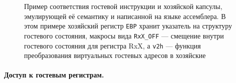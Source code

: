 

\begin{figure}[htb]
    \centering
    \caption{Пример соответствия гостевой инструкции и хозяйской капсулы, эмулирующей её семантику и написанной на языке ассемблера. В этом примере хозяйский регистр \texttt{EBP} хранит указатель на структуру гостевого состояния, макросы вида \texttt{RxX_OFF} --- смещение внутри гостевого состояния для регистра RxX, а \texttt{v2h} --- функция преобразования виртуальных гостевых адресов в хозяйские}
    \label{fig:capsule}
\end{figure}

\paragraph{Доступ к гостевым регистрам.}

